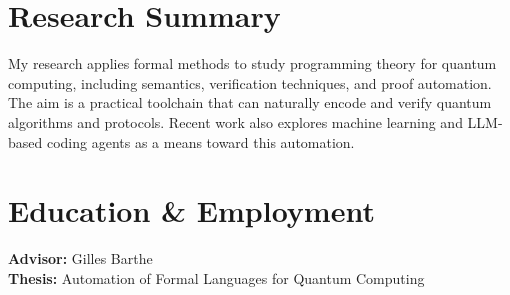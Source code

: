 \documentclass[11pt,a4paper]{moderncv}
\begin{document}
\makecvtitle

\section{Research Summary}

My research applies formal methods to study programming theory for quantum computing, including semantics, verification techniques, and proof automation. The aim is a practical toolchain that can naturally encode and verify quantum algorithms and protocols. Recent work also explores machine learning and LLM-based coding agents as a means toward this automation.


\par\medskip





\section{Education \& Employment}

{\textbf{Advisor:} Gilles Barthe \\
\textbf{Thesis:} Automation of Formal Languages for Quantum Computing}



\vspace{1em}


\vspace{1em}
\end{document}
